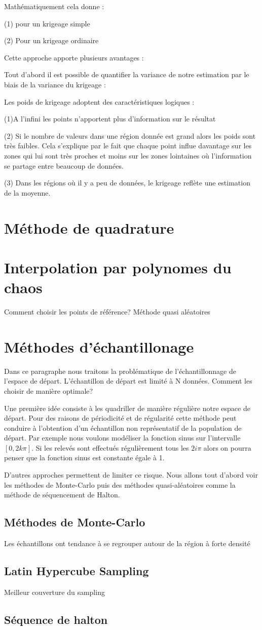 \documentclass[hidelinks,12pt]{article}
\begin{document}
Mathématiquement cela donne :

(1) pour un krigeage simple

(2) Pour un krigeage ordinaire

Cette approche apporte plusieurs avantages :

Tout d'abord il est possible de quantifier la variance de notre estimation par le biais de la variance du krigeage :

Les poids de krigeage adoptent des caractéristiques logiques :

(1)A l'infini les points n'apportent plus d'information sur le résultat

(2) Si le nombre de valeurs dans une région donnée est grand alors les poids sont très faibles. Cela s'explique par le fait que chaque point influe davantage sur les zones qui lui sont très proches et moins sur les zones lointaines où l'information se partage entre beaucoup de données.

(3) Dans les régions où il y a peu de données, le krigeage reflète une estimation de la moyenne.

\section{Méthode de quadrature}
\section{Interpolation par polynomes du chaos}

Comment choisir les points de référence? Méthode quasi aléatoires
\section{Méthodes d’échantillonage}
Dans ce paragraphe nous traitons la problématique de l’échantillonnage de l’espace de départ. L’échantillon de départ est limité à N données. Comment les choisir de manière optimale? 

Une première idée consiste à les quadriller de manière régulière notre espace de départ. Pour des raisons de périodicité et de régularité cette méthode peut conduire à l’obtention d’un échantillon non représentatif de la population de départ. Par exemple nous voulons modéliser la fonction sinus sur l’intervalle $[0,2k\pi ]$. Si les relevés sont effectués régulièrement tous les $2i\pi$ alors on pourra penser que la fonction sinus est constante égale à 1. 

D’autres approches permettent de limiter ce risque. Nous allons tout d’abord voir les méthodes de Monte-Carlo puis des méthodes quasi-aléatoires comme la méthode de séquencement de Halton.

\subsection{Méthodes de Monte-Carlo}
Les échantillons ont tendance à se regrouper autour de la région à forte densité


\subsection{Latin Hypercube Sampling}
Meilleur couverture du sampling

\subsection{Séquence de halton}
\end{document}

